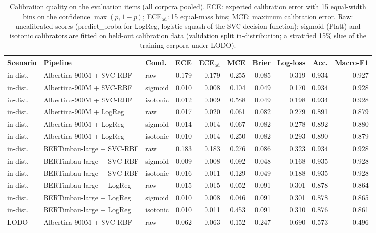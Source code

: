 \begin{table}[t]
\centering
\small
\caption{Calibration quality on the evaluation items (all corpora pooled). ECE: expected calibration error with 15 equal-width bins on the confidence $\max(p,1-p)$; ECE$_{\text{ad}}$: 15 equal-mass bins; MCE: maximum calibration error. Raw: uncalibrated scores (predict\_proba for LogReg, logistic squash of the SVC decision function); sigmoid (Platt) and isotonic calibrators are fitted on held-out calibration data (validation split in-distribution; a stratified 15\% slice of the training corpora under LODO).}
\label{tab:calibration-metrics}
\begin{tabular}{lllrrrrrrr}
\toprule
Scenario & Pipeline & Cond. & ECE & ECE$_{\text{ad}}$ & MCE & Brier & Log-loss & Acc. & Macro-F1 \\
\midrule
in-dist. & Albertina-900M + SVC-RBF & raw & 0.179 & 0.179 & 0.255 & 0.085 & 0.319 & 0.934 & 0.927 \\
in-dist. & Albertina-900M + SVC-RBF & sigmoid & 0.010 & 0.008 & 0.104 & 0.049 & 0.170 & 0.934 & 0.928 \\
in-dist. & Albertina-900M + SVC-RBF & isotonic & 0.012 & 0.009 & 0.588 & 0.049 & 0.198 & 0.934 & 0.928 \\
in-dist. & Albertina-900M + LogReg & raw & 0.017 & 0.020 & 0.061 & 0.082 & 0.279 & 0.891 & 0.879 \\
in-dist. & Albertina-900M + LogReg & sigmoid & 0.014 & 0.014 & 0.067 & 0.082 & 0.278 & 0.892 & 0.880 \\
in-dist. & Albertina-900M + LogReg & isotonic & 0.010 & 0.014 & 0.250 & 0.082 & 0.293 & 0.890 & 0.879 \\
in-dist. & BERTimbau-large + SVC-RBF & raw & 0.183 & 0.183 & 0.276 & 0.086 & 0.323 & 0.934 & 0.928 \\
in-dist. & BERTimbau-large + SVC-RBF & sigmoid & 0.009 & 0.008 & 0.092 & 0.048 & 0.168 & 0.935 & 0.928 \\
in-dist. & BERTimbau-large + SVC-RBF & isotonic & 0.016 & 0.011 & 0.129 & 0.049 & 0.188 & 0.935 & 0.928 \\
in-dist. & BERTimbau-large + LogReg & raw & 0.015 & 0.015 & 0.052 & 0.091 & 0.301 & 0.878 & 0.864 \\
in-dist. & BERTimbau-large + LogReg & sigmoid & 0.010 & 0.008 & 0.046 & 0.091 & 0.301 & 0.878 & 0.865 \\
in-dist. & BERTimbau-large + LogReg & isotonic & 0.010 & 0.011 & 0.453 & 0.091 & 0.310 & 0.876 & 0.861 \\
LODO & Albertina-900M + SVC-RBF & raw & 0.062 & 0.063 & 0.152 & 0.247 & 0.690 & 0.573 & 0.496 \\

\end{tabular}
\end{table}

